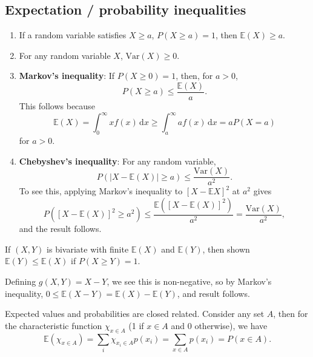 \documentclass[letter-paper]{tufte-book}
\newenvironment{example}[1][Example]{\begin{trivlist}
\item[\hskip \labelsep {\bfseries #1}]}{\end{trivlist}}
\newcommand\Def[1]{\textbf{#1}}
\begin{document}

\subsection{Expectation / probability inequalities}

\begin{enumerate}
  \item If a random variable satisfies $X\geq a$, $P(X\geq a) = 1$, then
  $\mathbb{E}(X) \geq a$.
  
  \item For any random variable $X$, $\mbox{Var}(X)\geq0$.
  
  \item \Def{Markov's inequality}: If $P(X\geq0)=1$, then, for $a>0$,
  \begin{equation*}
    P(X\geq a)\leq \frac{\mathbb{E}(X)}{a}.
  \end{equation*}
  This follows because
  \begin{equation*}
    \mathbb{E}(X) = \int_0^\infty xf(x)\, \mathrm{d}x \geq
      \int_a^\infty af(x)\, \mathrm{d}x = aP(X=a)
  \end{equation*}
  for $a>0$.
  
  \item \Def{Chebyshev's inequality}: For any random variable,
  \begin{equation*}
    P(|X-\mathbb{E}(X)| \geq a) \leq \frac{\mbox{Var}(X)}{a^2}.
  \end{equation*}
  To see this, applying Markov's inequality to $[X-\mathbb{E}X]^2$ at $a^2$
  gives
  \begin{equation*}
    P([X-\mathbb{E}(X)]^2\geq a^2) \leq
      \frac{\mathbb{E}([X-\mathbb{E}(X)]^2)}{a^2} = \frac{\mbox{Var}(X)}{a^2},
  \end{equation*}
  and the result follows.
\end{enumerate}

\begin{example}
  If $(X,Y)$ is bivariate with finite $\mathbb{E}(X)$ and $\mathbb{E}(Y)$, then
  shown $\mathbb{E}(Y) \leq \mathbb{E}(X)$ if $P(X\geq Y) = 1$.
  
  Defining $g(X,Y) = X - Y$, we see this is non-negative, so by Markov's
  inequality, $0\leq \mathbb{E}(X-Y) = \mathbb{E}(X) - \mathbb{E}(Y)$, and
  result follows.
\end{example}

Expected values and probabilities are closed related. Consider any set $A$, then
for the characteristic function $\chi_{x\in A}$ (1 if $x\in A$ and 0 otherwise),
we have 
\begin{equation*}
  \mathbb{E}(\chi_{x\in A}) = \sum_i \chi_{x_i \in A}p(x_i)
    = \sum_{x\in A} p(x_i) = P(x\in A).
\end{equation*}
\end{document}
